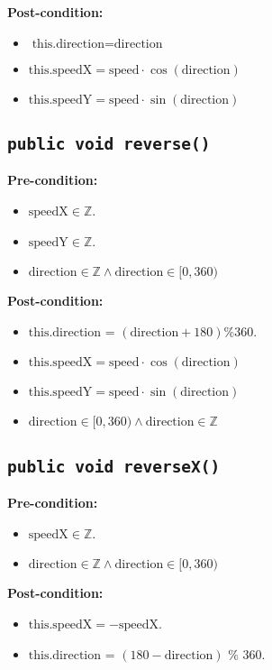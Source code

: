 \documentclass{article}
\begin{document}
\textbf{Post-condition:}
\begin{itemize}
    \item \( \text{this.direction} = \text{direction} \)
    \item \( \text{this.speedX} = \text{speed} \cdot \cos(\text{direction}) \)
    \item \( \text{this.speedY} = \text{speed} \cdot \sin(\text{direction}) \)
\end{itemize}


\subsection*{\texttt{public void reverse()}}
\textbf{Pre-condition:}
\begin{itemize}
    \item \( \text{speedX} \in \mathbb{Z} \).
    \item \( \text{speedY} \in \mathbb{Z} \).
    \item \( \text{direction} \in \mathbb{Z} \wedge \text{direction} \in [0,360) \)
\end{itemize}

\textbf{Post-condition:}
\begin{itemize}
    \item \( \text{this.direction} \) = \( (\text{direction} + 180) \% 360 \).
    \item \( \text{this.speedX} = \text{speed} \cdot \cos(\text{direction}) \)
    \item \( \text{this.speedY} = \text{speed} \cdot \sin(\text{direction}) \)
    \item \( \text{direction} \in [0,360) \wedge \text{direction} \in \mathbb{Z} \)
\end{itemize}

\subsection*{\texttt{public void reverseX()}}
\textbf{Pre-condition:}
\begin{itemize}
    \item \( \text{speedX} \in \mathbb{Z} \).
    \item \( \text{direction} \in \mathbb{Z} \wedge \text{direction} \in [0,360) \)
\end{itemize}

\textbf{Post-condition:}
\begin{itemize}
    \item \( \text{this.speedX} = -\text{speedX} \).
    \item \( \text{this.direction} \) = \( (180 - \text{direction}) \) \% 360.
\end{itemize}
\end{document}
